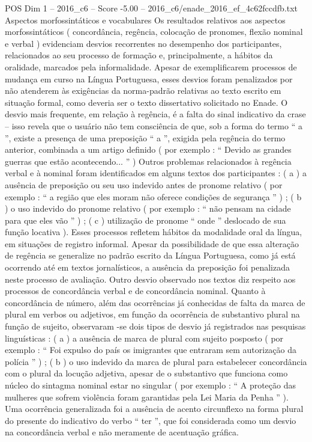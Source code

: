 \begin{textsample}{POS Dim 1 – 2016\_c6 – Score -5.00 – 2016\_c6/enade\_2016\_ef\_4c62fccdfb.txt}
Aspectos morfossintáticos e vocabulares Os resultados relativos aos aspectos morfossintáticos ( concordância, regência, colocação de pronomes, flexão nominal e verbal ) evidenciam desvios recorrentes no desempenho dos participantes, relacionados ao seu processo de formação e, principalmente, a hábitos da oralidade, marcados pela informalidade.
Apesar de exemplificarem processos de mudança em curso na Língua Portuguesa, esses desvios foram penalizados por não atenderem às exigências da norma-padrão relativas ao texto escrito em situação formal, como deveria ser o texto dissertativo solicitado no Enade.
O desvio mais frequente, em relação à regência, é a falta do sinal indicativo da crase – isso revela que o usuário não tem consciência de que, sob a forma do termo “ a ”, existe a presença de uma preposição “ a ”, exigida pela regência do termo anterior, combinada a um artigo definido ( por exemplo : “ Devido as grandes guerras que estão acontecendo... ” ) Outros problemas relacionados à regência verbal e à nominal foram identificados em alguns textos dos participantes : ( a ) a ausência de preposição ou seu uso indevido antes de pronome relativo ( por exemplo : “ a região que eles moram não oferece condições de segurança ” ) ; ( b ) o uso indevido do pronome relativo ( por exemplo : “ não pensam na cidade para que eles vão ” ) ; ( c ) utilização de pronome “ onde ” deslocado de sua função locativa ).
Esses processos refletem hábitos da modalidade oral da língua, em situações de registro informal.
Apesar da possibilidade de que essa alteração de regência se generalize no padrão escrito da Língua Portuguesa, como já está ocorrendo até em textos jornalísticos, a ausência da preposição foi penalizada neste processo de avaliação.
Outro desvio observado nos textos diz respeito aos processos de concordância verbal e de concordância nominal.
Quanto à concordância de número, além das ocorrências já conhecidas de falta da marca de plural em verbos ou adjetivos, em função da ocorrência de substantivo plural na função de sujeito, observaram -se dois tipos de desvio já registrados nas pesquisas linguísticas : ( a ) a ausência de marca de plural com sujeito posposto ( por exemplo : “ Foi expulso do país os imigrantes que entraram sem autorização da polícia ” ) ; ( b ) o uso indevido da marca de plural para estabelecer concordância com o plural da locução adjetiva, apesar de o substantivo que funciona como núcleo do sintagma nominal estar no singular ( por exemplo : “ A proteção das mulheres que sofrem violência foram garantidas pela Lei Maria da Penha ” ).
Uma ocorrência generalizada foi a ausência de acento circunflexo na forma plural do presente do indicativo do verbo “ ter ”, que foi considerada como um desvio na concordância verbal e não meramente de acentuação gráfica.

\end{textsample}
